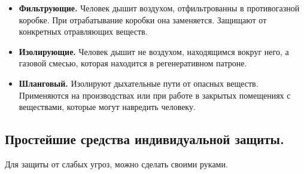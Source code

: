 \documentclass[12pt]{article}
\begin{document}
	\begin{itemize}
		\item \textbf{Фильтрующие.} Человек дышит воздухом, отфильтрованны в противогазной коробке. При отрабатывание коробки она заменяется. Защищают от конкретных отравляющих веществ.
		\item \textbf{Изолирующие.} Человек дышит не воздухом, находящимся вокруг него, а газовой смесью, которая находится в регенеративном патроне.
		\item \textbf{Шланговый.} Изолируют дыхательные пути от опасных веществ. Применяются на производствах или при работе в закрытых помещениях с веществами, которые могут навредить человеку.
	\end{itemize}
	
	\subsection{Простейшие средства индивидуальной защиты.}
	
	\begin{definition}
		Для защиты от слабых угроз, можно сделать своими руками.
	\end{definition}
\end{document}

